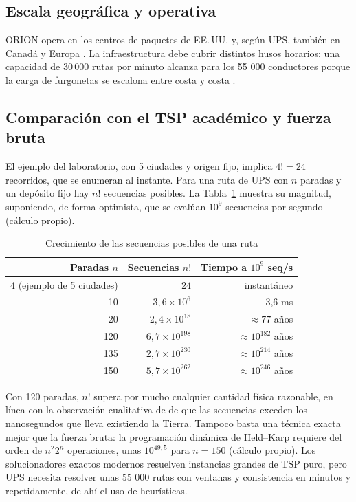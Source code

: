 \documentclass[11pt,a4paper]{article}
\begin{document}
\subsection{Escala geográfica y operativa}
ORION opera en los centros de paquetes de EE.\,UU. y, según UPS, también en Canadá y Europa \parencite{ups2020}. La infraestructura debe cubrir distintos husos horarios: una capacidad de 30\,000 rutas por minuto alcanza para los 55 000 conductores porque la carga de furgonetas se escalona entre costa y costa \parencite{holland2017}.

\subsection{Comparación con el TSP académico y fuerza bruta}
El ejemplo del laboratorio, con 5 ciudades y origen fijo, implica $4!=24$ recorridos, que se enumeran al instante. Para una ruta de UPS con $n$ paradas y un depósito fijo hay $n!$ secuencias posibles. La Tabla~\ref{tab:fuerzabruta} muestra su magnitud, suponiendo, de forma optimista, que se evalúan $10^{9}$ secuencias por segundo (cálculo propio).

\begin{table}[ht]
\centering\small
\caption{Crecimiento de las secuencias posibles de una ruta}
\label{tab:fuerzabruta}
\begin{tabular}{@{}r r r@{}}
\toprule
Paradas $n$ & Secuencias $n!$ & Tiempo a $10^{9}$ seq/s \\
\midrule
4 (ejemplo de 5 ciudades) & $24$ & instantáneo \\
10 & $3{,}6\times10^{6}$ & 3,6 ms \\
20 & $2{,}4\times10^{18}$ & $\approx 77$ años \\
120 & $6{,}7\times10^{198}$ & $\approx 10^{182}$ años \\
135 & $2{,}7\times10^{230}$ & $\approx 10^{214}$ años \\
150 & $5{,}7\times10^{262}$ & $\approx 10^{246}$ años \\
\bottomrule
\end{tabular}
\end{table}

Con 120 paradas, $n!$ supera por mucho cualquier cantidad física razonable, en línea con la observación cualitativa de \textcite{clevenger2016} de que las secuencias exceden los nanosegundos que lleva existiendo la Tierra. Tampoco basta una técnica exacta mejor que la fuerza bruta: la programación dinámica de Held--Karp \parencite{held1962} requiere del orden de $n^2 2^n$ operaciones, unas $10^{49{,}5}$ para $n=150$ (cálculo propio). Los solucionadores exactos modernos \parencite{applegate2006} resuelven instancias grandes de TSP puro, pero UPS necesita resolver unas 55 000 rutas con ventanas y consistencia en minutos y repetidamente, de ahí el uso de heurísticas.
\end{document}
